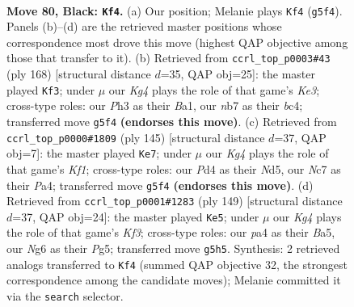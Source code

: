 \documentclass[11pt]{article}
\begin{document}
\clearpage

\begin{figure}[p]\centering
\begin{subfigure}{0.46\textwidth}\centering
\resizebox{\linewidth}{!}{%
\newchessgame
\chessboard[
  setfen={8/1Nn5/6n1/p5k1/Pb1pP3/1P1B3p/1K2P3/8 b - - 27 80},
  showmover=false,
  pgfstyle=straightmove, color=movearrow, markmove={g5-f4}
]}
\caption{}
\end{subfigure}\hfill
\begin{subfigure}{0.46\textwidth}\centering
\resizebox{\linewidth}{!}{%
\newchessgame
\chessboard[
  setfen={6k1/1B3p2/Pb4p1/2p1P2p/2b4P/4K1P1/8/B7 w - - 45 85},
  showmover=false,
  pgfstyle=straightmove, color=movearrow, markmove={e3-f3}
]}
\caption{}
\end{subfigure}
\\[4pt]
\begin{subfigure}{0.46\textwidth}\centering
\resizebox{\linewidth}{!}{%
\newchessgame
\chessboard[
  setfen={5k2/Np6/2b5/2PnB3/p1KP4/P7/8/8 b - - 12 73},
  showmover=false,
  pgfstyle=straightmove, color=movearrow, markmove={f8-e7}
]}
\caption{}
\end{subfigure}\hfill
\begin{subfigure}{0.46\textwidth}\centering
\resizebox{\linewidth}{!}{%
\newchessgame
\chessboard[
  setfen={8/8/5k2/b1n3pp/2B5/1P2PK1P/8/5N2 b - - 3 75},
  showmover=false,
  pgfstyle=straightmove, color=movearrow, markmove={f6-e5}
]}
\caption{}
\end{subfigure}
\caption{\textbf{Move 80, Black: \texttt{Kf4}.} (a) Our position; Melanie plays \texttt{Kf4} (\texttt{g5f4}). Panels (b)--(d) are the retrieved master positions whose correspondence most drove this move (highest QAP objective among those that transfer to it). (b) Retrieved from \texttt{ccrl\_top\_p0003\#43} (ply 168) [structural distance $d$=35, QAP obj=25]: the master played \texttt{Kf3}; under $\mu$ our \emph{Kg4} plays the role of that game's \emph{Ke3}; cross-type roles: our \emph{P}h3 as their \emph{B}a1, our \emph{n}b7 as their \emph{b}c4; transferred move \texttt{g5f4} \textbf{(endorses this move)}. (c) Retrieved from \texttt{ccrl\_top\_p0000\#1809} (ply 145) [structural distance $d$=37, QAP obj=7]: the master played \texttt{Ke7}; under $\mu$ our \emph{Kg4} plays the role of that game's \emph{Kf1}; cross-type roles: our \emph{P}d4 as their \emph{N}d5, our \emph{N}c7 as their \emph{P}a4; transferred move \texttt{g5f4} \textbf{(endorses this move)}. (d) Retrieved from \texttt{ccrl\_top\_p0001\#1283} (ply 149) [structural distance $d$=37, QAP obj=24]: the master played \texttt{Ke5}; under $\mu$ our \emph{Kg4} plays the role of that game's \emph{Kf3}; cross-type roles: our \emph{p}a4 as their \emph{B}a5, our \emph{N}g6 as their \emph{P}g5; transferred move \texttt{g5h5}. Synthesis: 2 retrieved analogs transferred to \texttt{Kf4} (summed QAP objective 32, the strongest correspondence among the candidate moves); Melanie committed it via the \texttt{search} selector.}
\label{fig:thought-m159}
\end{figure}
\end{document}
